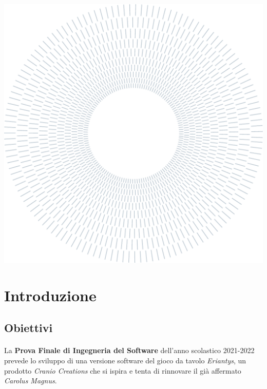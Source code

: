 \documentclass[a4paper, 12pt]{article}
\begin{document}
	\newpage
	\thispagestyle{plain}
	{\vspace*{11.0cm}\hspace*{-6cm}\includegraphics[width=0.85\paperwidth]{./raggiera_polimi.pdf}}
	
	\newpage
	
	\tableofcontents
	
	\newpage
	\section{Introduzione}
	\subsection{Obiettivi}
	\paragraph{}
	La \textbf{Prova Finale di Ingegneria del Software} dell'anno scolastico 2021-2022 prevede lo sviluppo di una versione software del gioco da tavolo \emph{Eriantys}, un prodotto \emph{Cranio Creations}\cite{eriantys} che si ispira e tenta di rinnovare il già affermato \emph{Carolus Magnus}\cite{carolusMagnus}.
	
\end{document}
